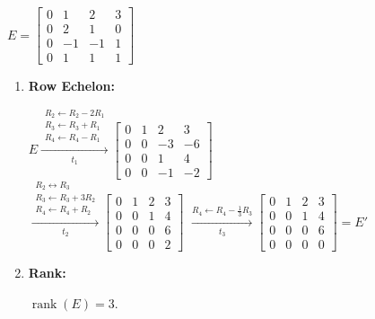 $E=
\begin{bmatrix}
    0 & 1 & 2 & 3 \\
    0 & 2 & 1 & 0 \\
    0 & -1 & -1 & 1 \\
    0 & 1 & 1 & 1
\end{bmatrix}
$ \\[1.0em]

\begin{enumerate}
    \item
    \textbf{Row Echelon:} \\[1.0em]
    \begin{answer}
        $E \xrightarrow[t_1]{
            \substack{
                R_2 \leftarrow R_2-2R_1 \\
                R_3 \leftarrow R_3+R_1 \\
                R_4 \leftarrow R_4-R_1
            }
        }
        \begin{bmatrix}
            0 & 1 & 2 & 3 \\
            0 & 0 & -3 & -6 \\
            0 & 0 & 1 & 4 \\
            0 & 0 & -1 & -2
        \end{bmatrix}
        $ \\[1.0em]

        $\xrightarrow[t_2]{
            \substack{
                R_2 \leftrightarrow R_3 \\
                R_3 \leftarrow R_3+3R_2 \\
                R_4 \leftarrow R_4+R_2
            }
        }
        \begin{bmatrix}
            0 & 1 & 2 & 3 \\
            0 & 0 & 1 & 4 \\
            0 & 0 & 0 & 6 \\
            0 & 0 & 0 & 2
        \end{bmatrix}
        $
        $\xrightarrow[t_3]{R_4 \leftarrow R_4-\frac{1}{3}R_3}
        \begin{bmatrix}
            0 & 1 & 2 & 3 \\
            0 & 0 & 1 & 4 \\
            0 & 0 & 0 & 6 \\
            0 & 0 & 0 & 0
        \end{bmatrix}
        = E'$
    \end{answer}

    \item
    \textbf{Rank:}
    \begin{answer}
        $\operatorname{rank}(E)=3.$
    \end{answer} \\


\end{enumerate}
